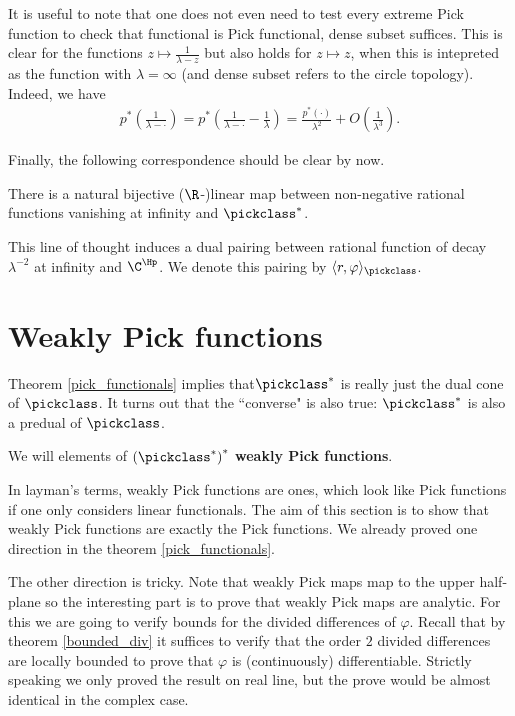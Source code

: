 It is useful to note that one does not even need to test every extreme Pick function to check that functional is Pick functional, dense subset suffices. This is clear for the functions $z \mapsto \frac{1}{\lambda - z}$ but also holds for $z \mapsto z$, when this is intepreted as the function with $\lambda = \infty$ (and dense subset refers to the circle topology). Indeed, we have
\begin{align*}
	p^{*}\left(\frac{1}{\lambda - \cdot}\right) = p^{*}\left(\frac{1}{\lambda - \cdot} - \frac{1}{\lambda}\right) = \frac{p^{*}(\cdot)}{\lambda^2} + O\left(\frac{1}{\lambda^3}\right).
\end{align*}

Finally, the following correspondence should be clear by now.

\begin{prop}
	There is a natural bijective ($\R$-)linear map between non-negative rational functions vanishing at infinity and $\pickclass^{*}$.
\end{prop}

This line of thought induces a dual pairing between rational function of decay $\lambda^{-2}$ at infinity and $\C^{\Hp}$. We denote this pairing by $\langle r, \varphi \rangle_{\pickclass}$.

\section{Weakly Pick functions}

Theorem \ref{pick_functionals} implies that$\pickclass^{*}$ is really just the dual cone of $\pickclass$. It turns out that the ``converse" is also true: $\pickclass^{*}$ is also a predual of $\pickclass$.

\begin{maar}
	We will elements of $\left(\pickclass^{*}\right)^{*}$ \textbf{weakly Pick functions}.
\end{maar}

In layman's terms, weakly Pick functions are ones, which look like Pick functions if one only considers linear functionals. The aim of this section is to show that weakly Pick functions are exactly the Pick functions. We already proved one direction in the theorem \ref{pick_functionals}. 

The other direction is tricky. Note that weakly Pick maps map to the upper half-plane so the interesting part is to prove that weakly Pick maps are analytic. For this we are going to verify bounds for the divided differences of $\varphi$. Recall that by theorem \ref{bounded_div} it suffices to verify that the order $2$ divided differences are locally bounded to prove that $\varphi$ is (continuously) differentiable. Strictly speaking we only proved the result on real line, but the prove would be almost identical in the complex case.

